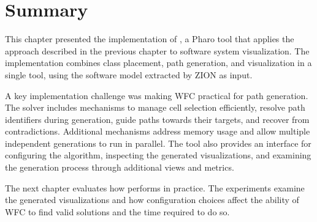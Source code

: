 \documentclass[../../main.tex]{subfiles}
\begin{document}
\section{Summary}

This chapter presented the implementation of \wassis, a Pharo tool that applies the approach described in the previous chapter to software system visualization. The implementation combines class placement, path generation, and visualization in a single tool, using the software model extracted by ZION as input.

A key implementation challenge was making WFC practical for path generation. The solver includes mechanisms to manage cell selection efficiently, resolve path identifiers during generation, guide paths towards their targets, and recover from contradictions. Additional mechanisms address memory usage and allow multiple independent generations to run in parallel. The tool also provides an interface for configuring the algorithm, inspecting the generated visualizations, and examining the generation process through additional views and metrics.

The next chapter evaluates how \wassis performs in practice. The experiments examine the generated visualizations and how configuration choices affect the ability of WFC to find valid solutions and the time required to do so.
\end{document}
